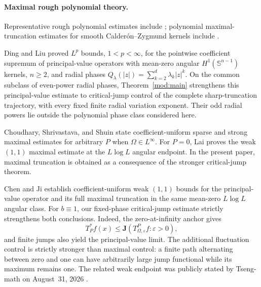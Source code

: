 \documentclass[11pt]{article}
\numberwithin{equation}{section}
\theoremstyle{remark}
\theoremstyle{definition}
\begin{document}
\paragraph{Maximal rough polynomial theory.}
Representative rough polynomial estimates include
\cite{LuZhang,AlSalman}; polynomial maximal-truncation estimates for
smooth Calder\'on--Zygmund kernels include \cite{KrauseLacey}.

Ding and Liu \cite[Theorem~1.1]{DingLiu2011} proved $L^p$ bounds,
$1<p<\infty$, for the pointwise coefficient supremum of principal-value
operators with mean-zero angular $H^1(\mathbb S^{n-1})$ kernels,
$n\ge2$, and radial phases
$Q_\lambda(|z|)=\sum_{k=2}^d\lambda_k|z|^k$.
On the common subclass of even-power radial phases,
Theorem~\ref{mod:main} strengthens this principal-value estimate to
critical-jump control of the complete sharp-truncation trajectory,
with every fixed finite radial variation exponent. Their odd radial
powers lie outside the polynomial phase class considered here.

Choudhary, Shrivastava, and Shuin \cite{CSS} state coefficient-uniform
sparse and strong maximal estimates for arbitrary $P$ when
$\Omega\in L^\infty$.  For $P=0$, Lai \cite[Theorem~1.1]{Lai} proves the
weak $(1,1)$ maximal estimate at the $L\log L$ angular endpoint.  In the
present paper, maximal truncation is obtained as a consequence of the
stronger critical-jump theorem.

Chen and Ji \cite[Theorems~1.1--1.2]{ChenJi} establish coefficient-uniform
weak $(1,1)$ bounds for the principal-value operator and its full maximal
truncation in the same mean-zero $L\log L$ angular class. For $b\equiv1$,
our fixed-phase critical-jump estimate strictly strengthens both
conclusions. Indeed, the zero-at-infinity anchor gives
\[
 T_P^*f(x)\le\mathbf J(T^P_{\Omega,\varepsilon}f:\varepsilon>0),
\]
and finite jumps also yield the principal-value limit. The additional
fluctuation control is strictly stronger than maximal control: a finite
path alternating between zero and one can have arbitrarily large jump
functional while its maximum remains one. The related weak endpoint
was publicly stated by Tseng-math on August~31, 2026 \cite{TsengPublic}.
\end{document}
